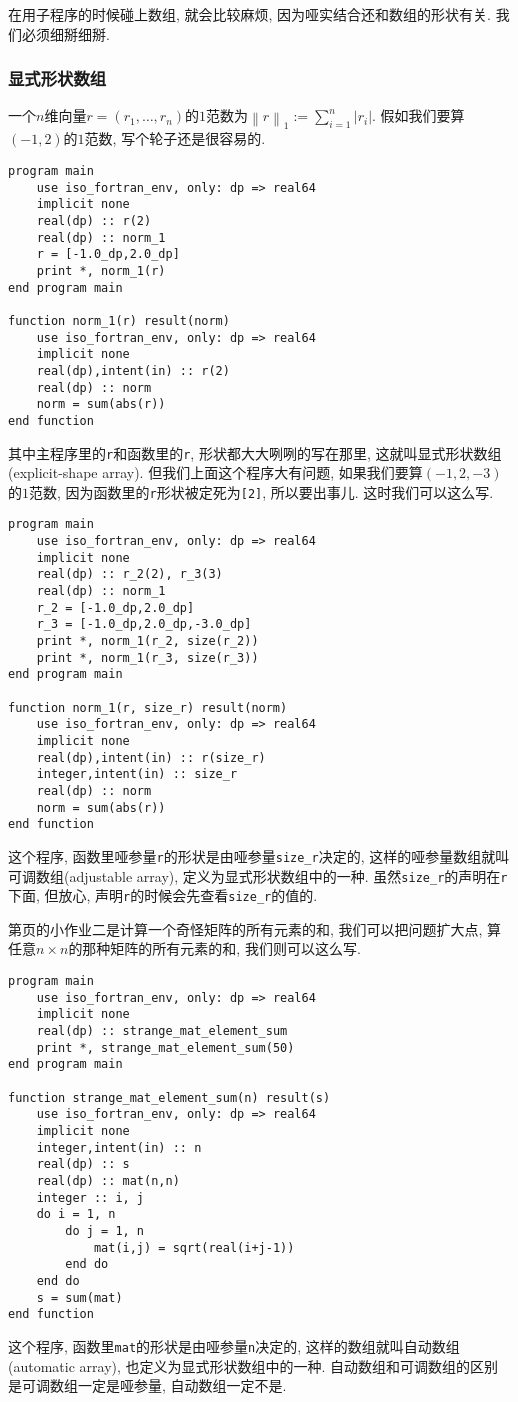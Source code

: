 在用子程序的时候碰上数组, 就会比较麻烦, 因为哑实结合还和数组的形状有关. 我们必须细掰细掰.

\subsubsection{显式形状数组}
一个$n$维向量$r=(r_1,\dots,r_n)$的$1$范数为$\left\lVert r\right\rVert_1:=\sum_{i=1}^n\left\lvert r_i\right\rvert $. 假如我们要算$(-1,2)$的$1$范数, 写个轮子还是很容易的.
\begin{verbatim}
program main
    use iso_fortran_env, only: dp => real64
    implicit none
    real(dp) :: r(2)
    real(dp) :: norm_1
    r = [-1.0_dp,2.0_dp]
    print *, norm_1(r)
end program main

function norm_1(r) result(norm)
    use iso_fortran_env, only: dp => real64
    implicit none
    real(dp),intent(in) :: r(2)
    real(dp) :: norm
    norm = sum(abs(r))
end function
\end{verbatim}
其中主程序里的\verb|r|和函数里的\verb|r|, 形状都大大咧咧的写在那里, 这就叫显式形状数组(explicit-shape array). 但我们上面这个程序大有问题, 如果我们要算$(-1,2,-3)$的$1$范数, 因为函数里的\verb|r|形状被定死为\verb|[2]|, 所以要出事儿. 这时我们可以这么写.\label{adjustable_array}
\begin{verbatim}
program main
    use iso_fortran_env, only: dp => real64
    implicit none
    real(dp) :: r_2(2), r_3(3)
    real(dp) :: norm_1
    r_2 = [-1.0_dp,2.0_dp]
    r_3 = [-1.0_dp,2.0_dp,-3.0_dp]
    print *, norm_1(r_2, size(r_2))
    print *, norm_1(r_3, size(r_3))
end program main

function norm_1(r, size_r) result(norm)
    use iso_fortran_env, only: dp => real64
    implicit none
    real(dp),intent(in) :: r(size_r)
    integer,intent(in) :: size_r
    real(dp) :: norm
    norm = sum(abs(r))
end function
\end{verbatim}
这个程序, 函数里哑参量\verb|r|的形状是由哑参量\verb|size_r|决定的, 这样的哑参量数组就叫可调数组(adjustable array), 定义为显式形状数组中的一种. 虽然\verb|size_r|的声明在\verb|r|下面, 但放心, 声明\verb|r|的时候会先查看\verb|size_r|的值的.

第\pageref{hw_2}页的小作业二是计算一个奇怪矩阵的所有元素的和, 我们可以把问题扩大点, 算任意$n\times n$的那种矩阵的所有元素的和, 我们则可以这么写.
\begin{verbatim}
program main
    use iso_fortran_env, only: dp => real64
    implicit none
    real(dp) :: strange_mat_element_sum
    print *, strange_mat_element_sum(50)
end program main

function strange_mat_element_sum(n) result(s)
    use iso_fortran_env, only: dp => real64
    implicit none
    integer,intent(in) :: n
    real(dp) :: s
    real(dp) :: mat(n,n)
    integer :: i, j
    do i = 1, n
        do j = 1, n
            mat(i,j) = sqrt(real(i+j-1))
        end do
    end do
    s = sum(mat)
end function
\end{verbatim}
这个程序, 函数里\verb|mat|的形状是由哑参量\verb|n|决定的, 这样的数组就叫自动数组(automatic array), 也定义为显式形状数组中的一种. 自动数组和可调数组的区别是可调数组一定是哑参量, 自动数组一定不是.


